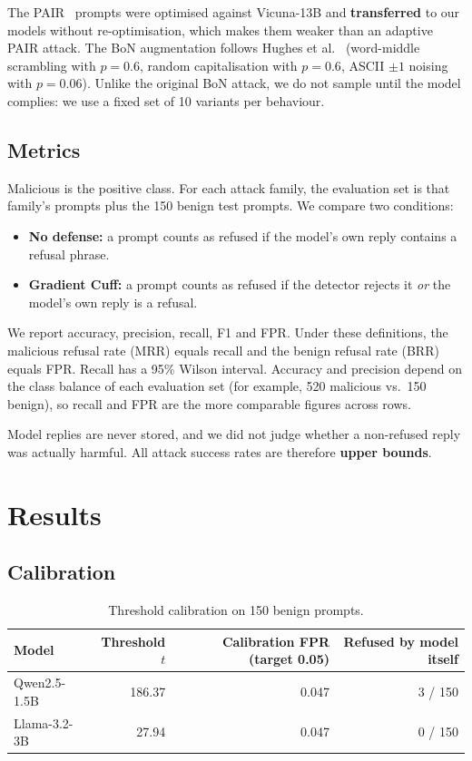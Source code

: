 \documentclass[11pt,a4paper]{article}
\begin{document}
The PAIR~\cite{chao2023pair} prompts were optimised against Vicuna-13B and \textbf{transferred} to our models without re-optimisation, which makes them weaker than an adaptive PAIR attack. The BoN augmentation follows Hughes et al.~\cite{hughes2024bon} (word-middle scrambling with $p = 0.6$, random capitalisation with $p = 0.6$, ASCII $\pm 1$ noising with $p = 0.06$). Unlike the original BoN attack, we do not sample until the model complies: we use a fixed set of 10 variants per behaviour.

\subsection{Metrics}

Malicious is the positive class. For each attack family, the evaluation set is that family's prompts plus the 150 benign test prompts. We compare two conditions:
\begin{itemize}
  \item \textbf{No defense:} a prompt counts as refused if the model's own reply contains a refusal phrase.
  \item \textbf{Gradient Cuff:} a prompt counts as refused if the detector rejects it \emph{or} the model's own reply is a refusal.
\end{itemize}

We report accuracy, precision, recall, F1 and FPR. Under these definitions, the malicious refusal rate (MRR) equals recall and the benign refusal rate (BRR) equals FPR. Recall has a 95\% Wilson interval. Accuracy and precision depend on the class balance of each evaluation set (for example, 520 malicious vs.\ 150 benign), so recall and FPR are the more comparable figures across rows.

Model replies are never stored, and we did not judge whether a non-refused reply was actually harmful. All attack success rates are therefore \textbf{upper bounds}.

\section{Results}

\subsection{Calibration}

\begin{table}[h]
\centering
\caption{Threshold calibration on 150 benign prompts.}
\begin{tabular}{lrrr}
\toprule
Model & Threshold $t$ & Calibration FPR (target 0.05) & Refused by model itself \\
\midrule
Qwen2.5-1.5B & 186.37 & 0.047 & 3 / 150 \\
Llama-3.2-3B & 27.94 & 0.047 & 0 / 150 \\
\bottomrule
\end{tabular}
\end{table}
\end{document}
